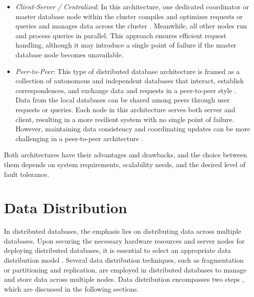 \begin{itemize}
\item[-] \emph{Client-Server / Centralized}: In this architecture, one dedicated coordinator or master database node within the cluster compiles and optimizes requests or queries and manages data across the cluster \cite{silberschatz2011database}. Meanwhile, all other nodes run and process queries in parallel. This approach ensures efficient request handling, although it may introduce a single point of failure if the master database node becomes unavailable.
\item[-] \emph{Peer-to-Peer}: This type of distributed database architecture is framed as a collection of autonomous and independent databases that interact, establish correspondences, and exchange data and requests in a peer-to-peer style \cite{10.1145/1374780.1374781}. Data from the local databases can be shared among peers through user requests or queries. Each node in this architecture serves both server and client, resulting in a more resilient system with no single point of failure. However, maintaining data consistency and coordinating updates can be more challenging in a peer-to-peer architecture \cite{10.1145/1374780.1374781}.
\end{itemize}

\noindent Both architectures have their advantages and drawbacks, and the choice between them depends on system requirements, scalability needs, and the desired level of fault tolerance.


\section{Data Distribution}
\label{2.2}

In distributed databases, the emphasis lies on distributing data across multiple databases. Upon securing the necessary hardware resources and server nodes for deploying distributed databases, it is essential to select an appropriate data distribution model \cite{ costa2015sharding, elmasri2000fundamentals}. Several data distribution techniques, such as fragmentation or partitioning and replication, are employed in distributed databases to manage and store data across multiple nodes. Data distribution encompasses two steps \cite{ramakrishnan2003database, rahimi2010distributed, ozsu1999principles, silberschatz2011database}, which are discussed in the following sections. 


